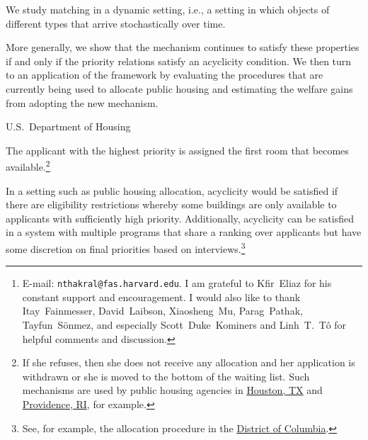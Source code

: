 \documentclass{article}
\begin{document}
\author{Neil Thakral\thanks{E-mail: \texttt{nthakral@fas.harvard.edu}. I am grateful to Kfir~Eliaz for his constant support and encouragement. I would also like to thank Itay~Fainmesser, David~Laibson, Xiaosheng~Mu, Parag~Pathak, Tayfun~S\"{o}nmez, and especially Scott~Duke~Kominers and Linh~T.~T\^{o} for helpful comments and discussion.}}

We study matching in a dynamic setting, i.e., a setting in which objects of different types that arrive stochastically over time.

More generally, we show that the mechanism continues to satisfy these properties if and only if the priority relations satisfy an acyclicity condition. We then turn to an application of the framework by evaluating the procedures that are currently being used to allocate public housing and estimating the welfare gains from adopting the new mechanism.

U.S.\ Department of Housing

The applicant with the highest priority is assigned the first room that becomes available.\footnote{If she refuses, then she does not receive any allocation and her application is withdrawn or she is moved to the bottom of the waiting list. Such mechanisms are used by public housing agencies in \href{http://www.housingforhouston.com/public-housing/apply-for-public-housing.aspx}{Houston, TX} and \href{http://www.pha-providence.com/index.php?cID=faq}{Providence, RI}, for example.}

In a setting such as public housing allocation, acyclicity would be satisfied if there are eligibility restrictions whereby some buildings are only available to applicants with sufficiently high priority. Additionally, acyclicity can be satisfied in a system with multiple programs that share a ranking over applicants but have some discretion on final priorities based on interviews.\footnote{See, for example, the allocation procedure in the \href{http://www.dchousing.org/?docid=95}{District of Columbia}.}
\end{document}

